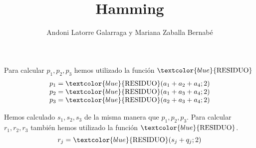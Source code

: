 \documentclass{article}
\title{Hamming}
\author{Andoni Latorre Galarraga y Mariana Zaballa Bernabé}
\date{}
\begin{document}
\maketitle

\noindent Para calcular $p_1,p_2,p_3$ hemos utilizado la función $\textcolor{blue}{\text{RESIDUO}}$
$$
\begin{array}{c}
p_1 = \textcolor{blue}{\text{RESIDUO}}(a_1 + a_2 + a_4; 2) \\
p_2 = \textcolor{blue}{\text{RESIDUO}}(a_1 + a_3 + a_4; 2) \\
p_3 = \textcolor{blue}{\text{RESIDUO}}(a_2 + a_3 + a_4; 2)
\end{array}
$$

\noindent Hemos calculado $s_1,s_2,s_3$ de la misma manera que $p_1,p_2,p_3$. Para calcular $r_1,r_2,r_3$ también hemos utilizado la función $\textcolor{blue}{\text{RESIDUO}}$.
$$
r_j = \textcolor{blue}{\text{RESIDUO}}(s_j + q_j ; 2)
$$
\end{document}
